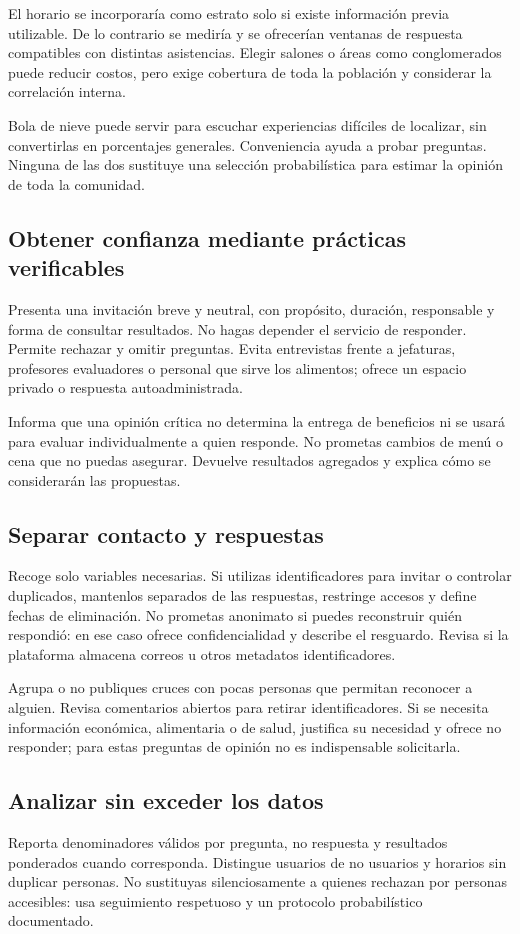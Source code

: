 \documentclass[11pt,letterpaper]{article}
\begin{document}
El horario se incorporaría como estrato solo si existe información previa utilizable. De lo contrario se mediría y se ofrecerían ventanas de respuesta compatibles con distintas asistencias. Elegir salones o áreas como conglomerados puede reducir costos, pero exige cobertura de toda la población y considerar la correlación interna.

Bola de nieve puede servir para escuchar experiencias difíciles de localizar, sin convertirlas en porcentajes generales. Conveniencia ayuda a probar preguntas. Ninguna de las dos sustituye una selección probabilística para estimar la opinión de toda la comunidad.

\subsection{Obtener confianza mediante prácticas verificables}
Presenta una invitación breve y neutral, con propósito, duración, responsable y forma de consultar resultados. No hagas depender el servicio de responder. Permite rechazar y omitir preguntas. Evita entrevistas frente a jefaturas, profesores evaluadores o personal que sirve los alimentos; ofrece un espacio privado o respuesta autoadministrada.

Informa que una opinión crítica no determina la entrega de beneficios ni se usará para evaluar individualmente a quien responde. No prometas cambios de menú o cena que no puedas asegurar. Devuelve resultados agregados y explica cómo se considerarán las propuestas.

\subsection{Separar contacto y respuestas}
Recoge solo variables necesarias. Si utilizas identificadores para invitar o controlar duplicados, mantenlos separados de las respuestas, restringe accesos y define fechas de eliminación. No prometas anonimato si puedes reconstruir quién respondió: en ese caso ofrece confidencialidad y describe el resguardo. Revisa si la plataforma almacena correos u otros metadatos identificadores.

Agrupa o no publiques cruces con pocas personas que permitan reconocer a alguien. Revisa comentarios abiertos para retirar identificadores. Si se necesita información económica, alimentaria o de salud, justifica su necesidad y ofrece no responder; para estas preguntas de opinión no es indispensable solicitarla.

\subsection{Analizar sin exceder los datos}
Reporta denominadores válidos por pregunta, no respuesta y resultados ponderados cuando corresponda. Distingue usuarios de no usuarios y horarios sin duplicar personas. No sustituyas silenciosamente a quienes rechazan por personas accesibles: usa seguimiento respetuoso y un protocolo probabilístico documentado.
\end{document}
